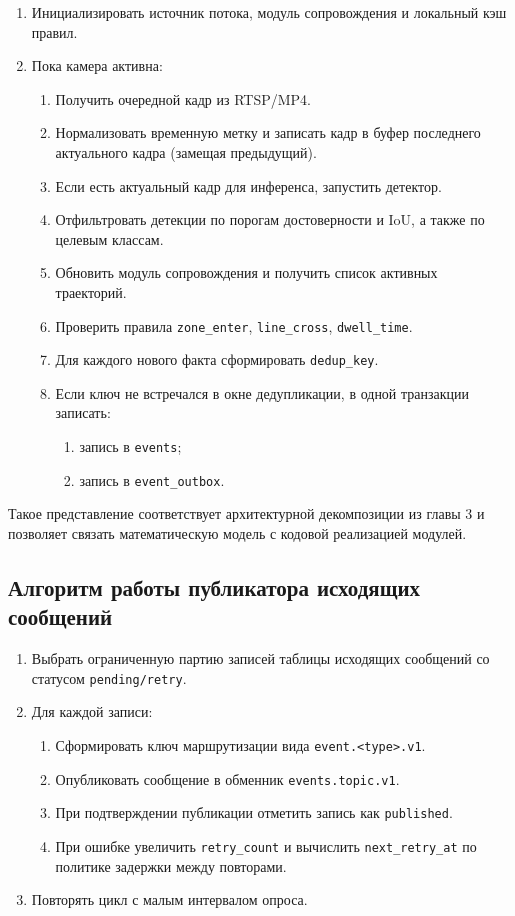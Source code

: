 \begin{enumerate}
    \item Инициализировать источник потока, модуль сопровождения и локальный кэш правил.
    \item Пока камера активна:
    \begin{enumerate}
        \item Получить очередной кадр из RTSP/MP4.
        \item Нормализовать временную метку и записать кадр в буфер последнего актуального кадра (замещая предыдущий).
        \item Если есть актуальный кадр для инференса, запустить детектор.
        \item Отфильтровать детекции по порогам достоверности и IoU, а также по целевым классам.
        \item Обновить модуль сопровождения и получить список активных траекторий.
        \item Проверить правила \texttt{zone\_enter}, \texttt{line\_cross}, \texttt{dwell\_time}.
        \item Для каждого нового факта сформировать \texttt{dedup\_key}.
        \item Если ключ не встречался в окне дедупликации, в одной транзакции записать:
        \begin{enumerate}
            \item запись в \texttt{events};
            \item запись в \texttt{event\_outbox}.
        \end{enumerate}
    \end{enumerate}
\end{enumerate}

Такое представление соответствует архитектурной декомпозиции из главы 3 и позволяет связать математическую модель с кодовой реализацией модулей.

\subsection{Алгоритм работы публикатора исходящих сообщений}

\begin{enumerate}
    \item Выбрать ограниченную партию записей таблицы исходящих сообщений со статусом \texttt{pending/retry}.
    \item Для каждой записи:
    \begin{enumerate}
        \item Сформировать ключ маршрутизации вида \texttt{event.<type>.v1}.
        \item Опубликовать сообщение в обменник \texttt{events.topic.v1}.
        \item При подтверждении публикации отметить запись как \texttt{published}.
        \item При ошибке увеличить \texttt{retry\_count} и вычислить \texttt{next\_retry\_at} по политике задержки между повторами.
    \end{enumerate}
    \item Повторять цикл с малым интервалом опроса.
\end{enumerate}

